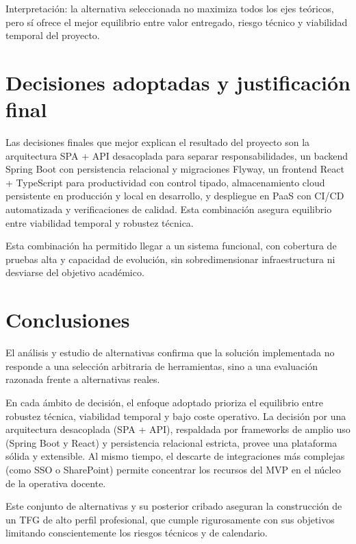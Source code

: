 Interpretaci\'on:
la alternativa seleccionada no maximiza todos los ejes te\'oricos,
pero s\'i ofrece el mejor equilibrio entre valor entregado,
riesgo t\'ecnico y viabilidad temporal del proyecto.

\FloatBarrier
\section{Decisiones adoptadas y justificaci\'on final}

Las decisiones finales que mejor explican el resultado del proyecto son la arquitectura SPA + API desacoplada para separar responsabilidades, un backend Spring Boot con persistencia relacional y migraciones Flyway, un frontend React + TypeScript para productividad con control tipado, almacenamiento cloud persistente en producci\'on y local en desarrollo, y despliegue en PaaS con CI/CD automatizada y verificaciones de calidad. Esta combinaci\'on asegura equilibrio entre viabilidad temporal y robustez t\'ecnica.

Esta combinaci\'on ha permitido llegar a un sistema funcional,
con cobertura de pruebas alta y capacidad de evoluci\'on,
sin sobredimensionar infraestructura ni desviarse del objetivo acad\'emico.

\FloatBarrier
\section{Conclusiones}

El an\'alisis y estudio de alternativas confirma que la soluci\'on implementada no responde a una selecci\'on arbitraria de herramientas, sino a una evaluaci\'on razonada frente a alternativas reales. 

En cada \'ambito de decisi\'on, el enfoque adoptado prioriza el equilibrio entre robustez t\'ecnica, viabilidad temporal y bajo coste operativo. La decisi\'on por una arquitectura desacoplada (SPA + API), respaldada por frameworks de amplio uso (Spring Boot y React) y persistencia relacional estricta, provee una plataforma s\'olida y extensible. Al mismo tiempo, el descarte de integraciones m\'as complejas (como SSO o SharePoint) permite concentrar los recursos del MVP en el n\'ucleo de la operativa docente. 

Este conjunto de alternativas y su posterior cribado aseguran la construcci\'on de un TFG de alto perfil profesional, que cumple rigurosamente con sus objetivos limitando conscientemente los riesgos t\'ecnicos y de calendario.
	
	 


























